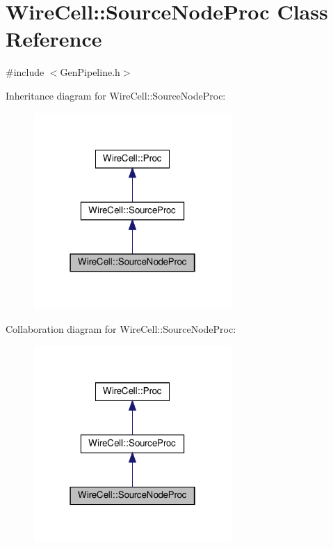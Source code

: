 \hypertarget{class_wire_cell_1_1_source_node_proc}{}\section{Wire\+Cell\+:\+:Source\+Node\+Proc Class Reference}
\label{class_wire_cell_1_1_source_node_proc}


{\ttfamily \#include $<$Gen\+Pipeline.\+h$>$}



Inheritance diagram for Wire\+Cell\+:\+:Source\+Node\+Proc\+:
\nopagebreak
\begin{figure}[H]
\begin{center}
\leavevmode
\includegraphics[width=214pt]{class_wire_cell_1_1_source_node_proc__inherit__graph}
\end{center}
\end{figure}


Collaboration diagram for Wire\+Cell\+:\+:Source\+Node\+Proc\+:
\nopagebreak
\begin{figure}[H]
\begin{center}
\leavevmode
\includegraphics[width=214pt]{class_wire_cell_1_1_source_node_proc__coll__graph}
\end{center}
\end{figure}
